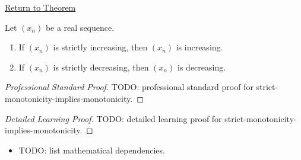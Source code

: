 \newpage
{}
\label{prf:strict-monotonicity-implies-monotonicity}

\begin{remark*}[Return]
\hyperref[thm:strict-monotonicity-implies-monotonicity]{Return to Theorem}
\end{remark*}

\begin{theorem*}
Let $(x_n)$ be a real sequence.
\begin{enumerate}[label=(\alph*)]
  \item If $(x_n)$ is strictly increasing, then $(x_n)$ is increasing.
  \item If $(x_n)$ is strictly decreasing, then $(x_n)$ is decreasing.
\end{enumerate}

\smallskip
\noindent
\end{theorem*}

\begin{proof}[Professional Standard Proof]
\LRAProofBodyStart
TODO: professional standard proof for strict-monotonicity-implies-monotonicity.
\end{proof}

\begin{proof}[Detailed Learning Proof]
\LRAProofBodyStart
TODO: detailed learning proof for strict-monotonicity-implies-monotonicity.
\end{proof}

\begin{remark*}
\end{remark*}

\begin{dependencies}
\begin{itemize}
  \item TODO: list mathematical dependencies.
\end{itemize}
\end{dependencies}

\clearpage
